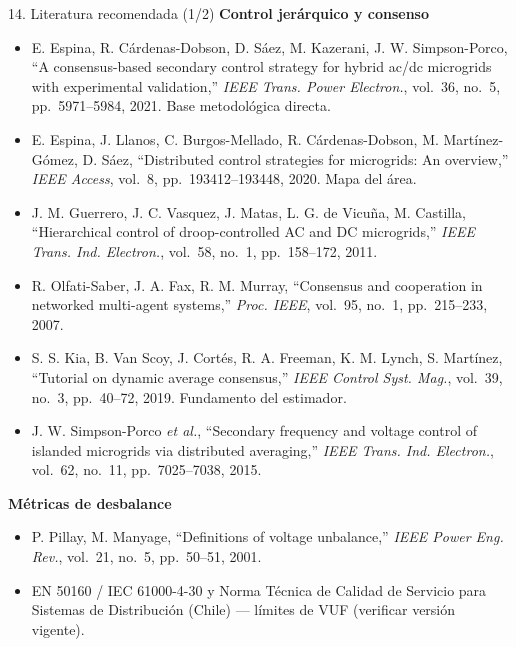 \documentclass[aspectratio=169,11pt]{beamer}
\begin{document}
\begin{frame}{14. Literatura recomendada (1/2)}
  \scriptsize
  \textbf{Control jerárquico y consenso}
  \begin{itemize}\setlength\itemsep{1pt}
    \item[{[1]}] E. Espina, R. Cárdenas-Dobson, D. Sáez, M. Kazerani, J. W. Simpson-Porco, ``A consensus-based secondary control strategy for hybrid ac/dc microgrids with experimental validation,'' \emph{IEEE Trans. Power Electron.}, vol.~36, no.~5, pp.~5971--5984, 2021. \alert{Base metodológica directa.}
    \item[{[2]}] E. Espina, J. Llanos, C. Burgos-Mellado, R. Cárdenas-Dobson, M. Martínez-Gómez, D. Sáez, ``Distributed control strategies for microgrids: An overview,'' \emph{IEEE Access}, vol.~8, pp.~193412--193448, 2020. \alert{Mapa del área.}
    \item[{[3]}] J. M. Guerrero, J. C. Vasquez, J. Matas, L. G. de Vicuña, M. Castilla, ``Hierarchical control of droop-controlled AC and DC microgrids,'' \emph{IEEE Trans. Ind. Electron.}, vol.~58, no.~1, pp.~158--172, 2011.
    \item[{[4]}] R. Olfati-Saber, J. A. Fax, R. M. Murray, ``Consensus and cooperation in networked multi-agent systems,'' \emph{Proc. IEEE}, vol.~95, no.~1, pp.~215--233, 2007.
    \item[{[9]}] S. S. Kia, B. Van Scoy, J. Cortés, R. A. Freeman, K. M. Lynch, S. Martínez, ``Tutorial on dynamic average consensus,'' \emph{IEEE Control Syst. Mag.}, vol.~39, no.~3, pp.~40--72, 2019. \alert{Fundamento del estimador.}
    \item[{[7]}] J. W. Simpson-Porco \emph{et al.}, ``Secondary frequency and voltage control of islanded microgrids via distributed averaging,'' \emph{IEEE Trans. Ind. Electron.}, vol.~62, no.~11, pp.~7025--7038, 2015.
  \end{itemize}
  \textbf{Métricas de desbalance}
  \begin{itemize}\setlength\itemsep{1pt}
    \item[{[14]}] P. Pillay, M. Manyage, ``Definitions of voltage unbalance,'' \emph{IEEE Power Eng. Rev.}, vol.~21, no.~5, pp.~50--51, 2001.
    \item[{[15]}] EN 50160 / IEC 61000-4-30 y Norma Técnica de Calidad de Servicio para Sistemas de Distribución (Chile) --- límites de VUF (verificar versión vigente).
  \end{itemize}
\end{frame}
\end{document}
